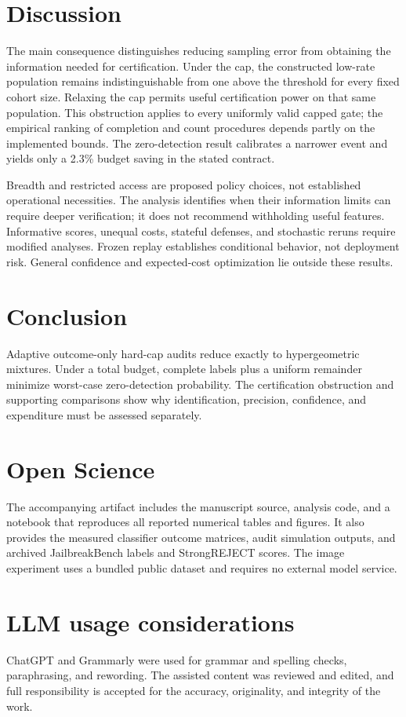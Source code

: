 \documentclass[conference]{IEEEtran}
\begin{document}
\section{Discussion}
The main consequence distinguishes reducing sampling error from obtaining the information needed for certification. Under the cap, the constructed low-rate population remains indistinguishable from one above the threshold for every fixed cohort size. Relaxing the cap permits useful certification power on that same population. This obstruction applies to every uniformly valid capped gate; the empirical ranking of completion and count procedures depends partly on the implemented bounds. The zero-detection result calibrates a narrower event and yields only a 2.3\% budget saving in the stated contract.

Breadth and restricted access are proposed policy choices, not established operational necessities. The analysis identifies when their information limits can require deeper verification; it does not recommend withholding useful features. Informative scores, unequal costs, stateful defenses, and stochastic reruns require modified analyses. Frozen replay establishes conditional behavior, not deployment risk. General confidence and expected-cost optimization lie outside these results.

\section{Conclusion}
Adaptive outcome-only hard-cap audits reduce exactly to hypergeometric mixtures. Under a total budget, complete labels plus a uniform remainder minimize worst-case zero-detection probability. The certification obstruction and supporting comparisons show why identification, precision, confidence, and expenditure must be assessed separately.

\section*{Open Science}
The accompanying artifact includes the manuscript source, analysis code, and a notebook that reproduces all reported numerical tables and figures. It also provides the measured classifier outcome matrices, audit simulation outputs, and archived JailbreakBench labels and StrongREJECT scores. The image experiment uses a bundled public dataset and requires no external model service.

\section*{LLM usage considerations}
ChatGPT and Grammarly were used for grammar and spelling checks, paraphrasing, and rewording. The assisted content was reviewed and edited, and full responsibility is accepted for the accuracy, originality, and integrity of the work.
\end{document}
